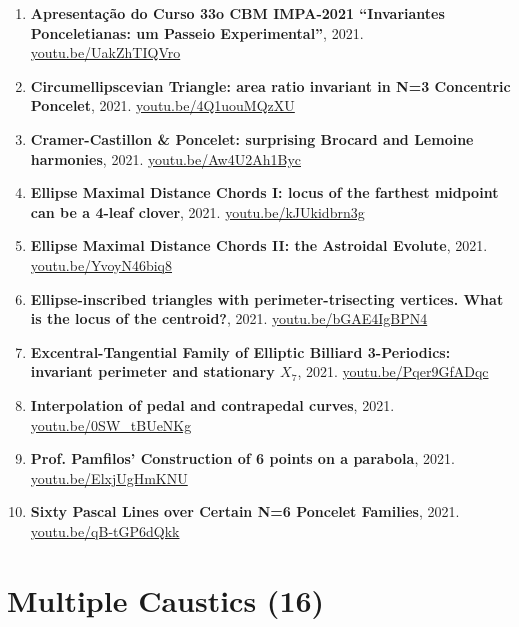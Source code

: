 \documentclass[12pt]{article}
\begin{document}
\begin{enumerate}[resume]
\item \textbf{Apresentação do Curso 33o CBM IMPA-2021
``Invariantes Ponceletianas: um Passeio Experimental''}, 2021. \href{https://youtu.be/UakZhTIQVro}{\url{youtu.be/UakZhTIQVro}}
\item \textbf{Circumellipscevian Triangle: area ratio invariant in N=3 Concentric Poncelet}, 2021. \href{https://youtu.be/4Q1uouMQzXU}{\url{youtu.be/4Q1uouMQzXU}}
\item \textbf{Cramer-Castillon \& Poncelet: surprising Brocard and Lemoine harmonies}, 2021. \href{https://youtu.be/Aw4U2Ah1Byc}{\url{youtu.be/Aw4U2Ah1Byc}}
\item \textbf{Ellipse Maximal Distance Chords I: locus of the farthest midpoint can be a 4-leaf clover}, 2021. \href{https://youtu.be/kJUkidbrn3g}{\url{youtu.be/kJUkidbrn3g}}
\item \textbf{Ellipse Maximal Distance Chords II: the Astroidal Evolute}, 2021. \href{https://youtu.be/YvoyN46biq8}{\url{youtu.be/YvoyN46biq8}}
\item \textbf{Ellipse-inscribed triangles with perimeter-trisecting vertices. What is the locus of the centroid?}, 2021. \href{https://youtu.be/bGAE4IgBPN4}{\url{youtu.be/bGAE4IgBPN4}}
\item \textbf{Excentral-Tangential Family of Elliptic Billiard 3-Periodics: invariant perimeter and stationary $X_{7}$}, 2021. \href{https://youtu.be/Pqer9GfADqc}{\url{youtu.be/Pqer9GfADqc}}
\item \textbf{Interpolation of pedal and contrapedal curves}, 2021. \href{https://youtu.be/0SW_tBUeNKg}{\url{youtu.be/0SW\_tBUeNKg}}
\item \textbf{Prof. Pamfilos' Construction of 6 points on a parabola}, 2021. \href{https://youtu.be/ElxjUgHmKNU}{\url{youtu.be/ElxjUgHmKNU}}
\item \textbf{Sixty Pascal Lines over Certain N=6 Poncelet Families}, 2021. \href{https://youtu.be/qB-tGP6dQkk}{\url{youtu.be/qB-tGP6dQkk}}
\end{enumerate}

\section{Multiple Caustics (16)}
\end{document}
